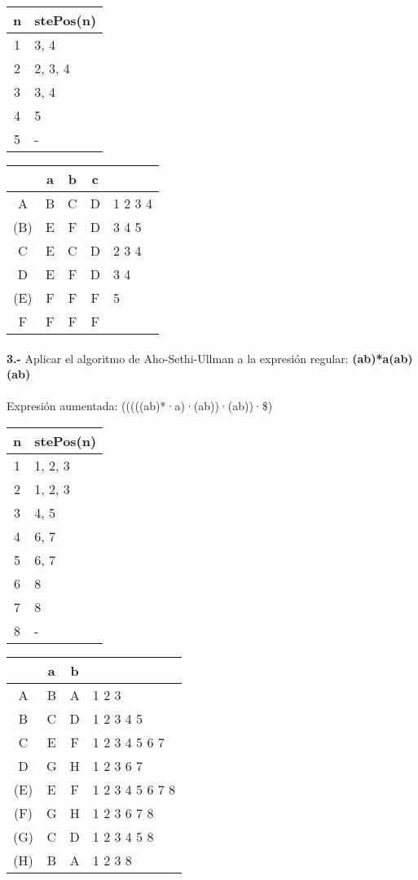 \documentclass[11pt,a4paper]{report}
\begin{document}
\begin{tabular} {| c | l |}
\hline
n & stePos(n) \\ \hline
1 & 3, 4 \\ \hline
2 & 2, 3, 4 \\ \hline
3 & 3, 4 \\ \hline
4 & 5 \\ \hline
5 & - \\ \hline
\end{tabular}
\quad
\begin{tabular} {| c | c |c |c | l |}
\hline 
& a & b & c & \\ \hline
A & B & C & D & 1 2 3 4 \\ \hline
(B) & E & F & D & 3 4 5 \\ \hline
C & E & C & D & 2 3 4 \\ \hline
D & E & F & D & 3 4 \\ \hline
(E) & F & F & F & 5 \\ \hline
F & F & F & F & \\ \hline
\end{tabular}\paragraph{}
\textbf{3.-} Aplicar el algoritmo de Aho-Sethi-Ullman a la expresión regular: \textbf{(a\textbar b)*a(a\textbar b)(a\textbar b)} \\
\\
Expresión aumentada: (((((a\textbar b)*·a)·(a\textbar b))·(a\textbar b))·\$) \\

\begin{tabular} {| c | l |}
\hline
n & stePos(n) \\ \hline
1 & 1, 2, 3 \\ \hline
2 & 1, 2, 3 \\ \hline
3 & 4, 5 \\ \hline
4 & 6, 7 \\ \hline
5 & 6, 7 \\ \hline
6 & 8 \\ \hline
7 & 8 \\ \hline
8 & - \\ \hline
\end{tabular}
\quad
\begin{tabular} {| c | c |c | l |}
\hline 
& a & b & \\ \hline
A & B & A & 1 2 3 \\ \hline
B & C & D & 1 2 3 4 5 \\ \hline
C & E & F & 1 2 3 4 5 6 7 \\ \hline
D & G & H & 1 2 3 6 7 \\ \hline
(E) & E & F & 1 2 3 4 5 6 7 8 \\ \hline
(F) & G & H & 1 2 3 6 7 8 \\ \hline
(G) & C & D & 1 2 3 4 5 8 \\ \hline
(H) & B & A & 1 2 3 8 \\ \hline
\end{tabular}
\end{document}
